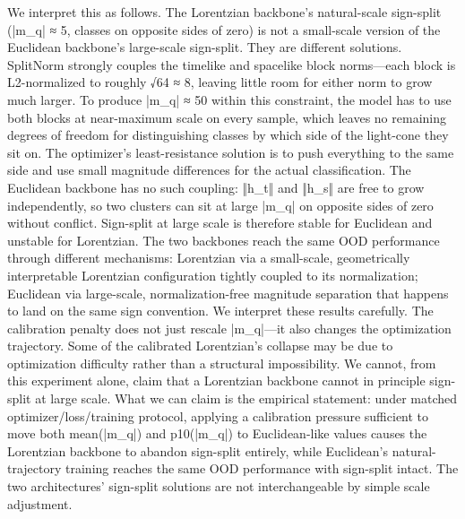 We interpret this as follows. The Lorentzian backbone's natural-scale sign-split (|m_q| ≈ 5, classes on opposite sides of zero) is not a small-scale version of the Euclidean backbone's large-scale sign-split. They are different solutions. SplitNorm strongly couples the timelike and spacelike block norms—each block is L2-normalized to roughly √64 ≈ 8, leaving little room for either norm to grow much larger. To produce |m_q| ≈ 50 within this constraint, the model has to use both blocks at near-maximum scale on every sample, which leaves no remaining degrees of freedom for distinguishing classes by which side of the light-cone they sit on. The optimizer's least-resistance solution is to push everything to the same side and use small magnitude differences for the actual classification.
The Euclidean backbone has no such coupling: ‖h_t‖ and ‖h_s‖ are free to grow independently, so two clusters can sit at large |m_q| on opposite sides of zero without conflict. Sign-split at large scale is therefore stable for Euclidean and unstable for Lorentzian. The two backbones reach the same OOD performance through different mechanisms: Lorentzian via a small-scale, geometrically interpretable Lorentzian configuration tightly coupled to its normalization; Euclidean via large-scale, normalization-free magnitude separation that happens to land on the same sign convention.
We interpret these results carefully. The calibration penalty does not just rescale |m_q|—it also changes the optimization trajectory. Some of the calibrated Lorentzian's collapse may be due to optimization difficulty rather than a structural impossibility. We cannot, from this experiment alone, claim that a Lorentzian backbone cannot in principle sign-split at large scale. What we can claim is the empirical statement: under matched optimizer/loss/training protocol, applying a calibration pressure sufficient to move both mean(|m_q|) and p10(|m_q|) to Euclidean-like values causes the Lorentzian backbone to abandon sign-split entirely, while Euclidean's natural-trajectory training reaches the same OOD performance with sign-split intact. The two architectures' sign-split solutions are not interchangeable by simple scale adjustment.

